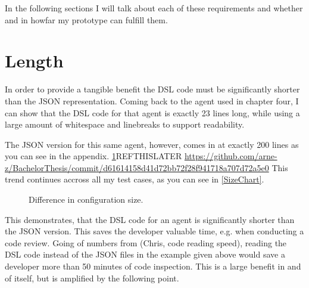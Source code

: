 In the following sections I will talk about each of these requirements and whether and in howfar my prototype can fulfill them.

\section{Length}

In order to provide a tangible benefit the DSL code must be significantly shorter than the JSON representation. Coming back to the agent used in chapter four, I can show that the DSL code for that agent is exactly 23 lines long, while using a large amount of whitespace and linebreaks to support readability.

The JSON version for this same agent, however, comes in at exactly 200 lines as you can see in the appendix. \ref{}REFTHISLATER \url{https://github.com/arne-z/BachelorThesis/commit/d61614158d41d72bb72f28f941718a707d72a5e0}
This trend continues accross all my test cases, as you can see in \autoref{SizeChart}.
\begin{figure}
    \centering
    
    \caption{Difference in configuration size.}
    \label{SizeChart}
    
\end{figure}
This demonstrates, that the DSL code for an agent is significantly shorter than the JSON version. This saves the developer valuable time, e.g. when conducting a code review. Going of numbers from \citeNeeded (Chris, code reading speed), reading the DSL code instead of the JSON files in the example given above would save a developer more than 50 minutes of code inspection. This is a large benefit in and of itself, but is amplified by the following point.

